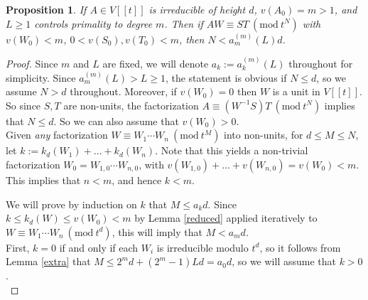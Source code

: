\documentclass{article}
\newcommand{\Mod}[1]{\ (\mathrm{mod}\ #1)}
\theoremstyle{plain}
\newtheorem{proposition}[theorem]{Proposition}
\theoremstyle{definition}
\theoremstyle{remark}
\theoremstyle{plain}
\begin{document}
\begin{proposition}\label{N_m}
If $A\in V[[t]]$ is irreducible of height $d$, $v(A_0)=m>1$, and $L\geq 1$ controls primality to degree $m$. Then if $AW\equiv ST\Mod{t^N}$ with $v(W_0)<m$, $0<v(S_0),v(T_0)<m$, then $N<a_m^{(m)}(L)d$.
\end{proposition}

\begin{proof}
Since $m$ and $L$ are fixed, we will denote $a_k:=a_k^{(m)}(L)$ throughout for simplicity.
Since $a_m^{(m)}(L)>L\geq 1$, the statement is obvious if $N\leq d$, so we assume $N> d$ throughout. Moreover, if $v(W_0)=0$ then $W$ is a unit in $V[[t]]$. So since $S,T$ are non-units, the factorization $A\equiv (W^{-1}S)T\Mod{t^N}$ implies that $N\leq d$. So we can also assume that $v(W_0)>0$.\\


\noindent Given \emph{any} factorization $W\equiv W_1\cdots W_n\Mod{t^M}$ into non-units, for $d\leq M\leq N$, let $k:=k_d(W_1)+\dots+k_d(W_n)$. Note that this yields a non-trivial factorization $W_0=W_{1,0}\cdots W_{n,0}$, with $v(W_{1,0})+\dots+v(W_{n,0})=v(W_0)<m$. This implies that $n<m$, and hence $k<m$.

We will prove by induction on $k$ that $M\leq a_k d$. Since $k\leq k_d(W)\leq v(W_0)<m$ by Lemma \ref{reduced} applied iteratively to $W\equiv W_1\cdots W_n\Mod{t^d}$, this will imply that $M<a_md$.\\

\noindent First, $k=0$ if and only if each $W_i$ is irreducible modulo $t^d$, so it follows from Lemma \ref{extra} that $M\leq 2^md+(2^m-1)Ld=a_0d$, so we will assume that $k>0$. \\



\end{proof}
\end{document}
